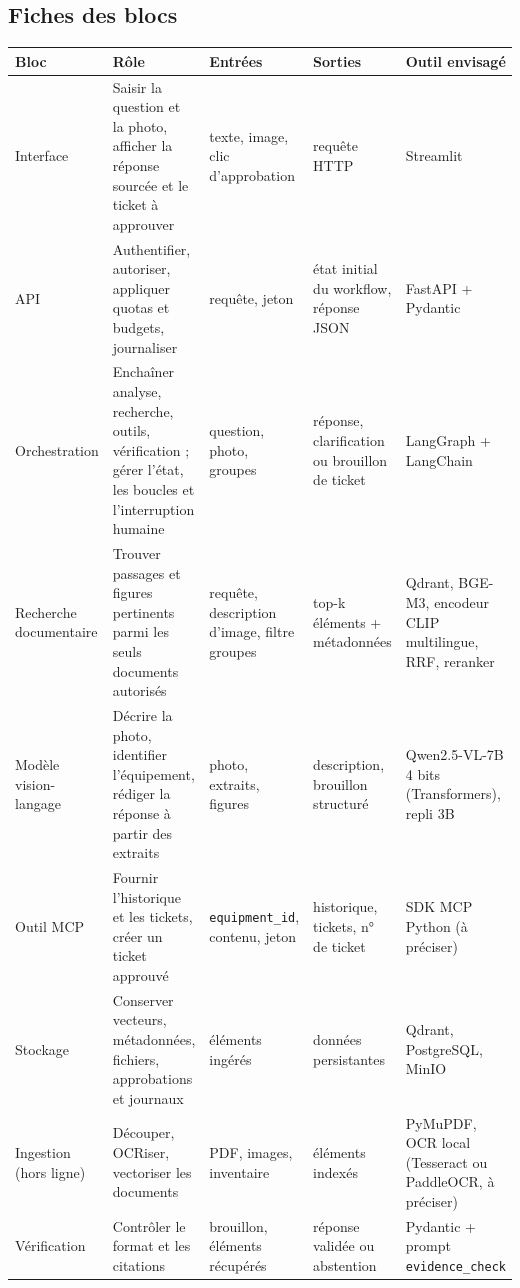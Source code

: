 \documentclass[11pt,a4paper]{article}
\begin{document}
\subsection{Fiches des blocs}
\begin{center}\small
\begin{longtable}{L{2.3cm}L{3.9cm}L{2.9cm}L{3.0cm}L{2.8cm}}
\toprule
\textbf{Bloc} & \textbf{Rôle} & \textbf{Entrées} & \textbf{Sorties} & \textbf{Outil envisagé}\\\midrule\endhead
Interface & Saisir la question et la photo, afficher la réponse sourcée et le ticket à approuver & texte, image, clic d'approbation & requête HTTP & Streamlit\\
API & Authentifier, autoriser, appliquer quotas et budgets, journaliser & requête, jeton & état initial du workflow, réponse JSON & FastAPI + Pydantic\\
Orchestration & Enchaîner analyse, recherche, outils, vérification ; gérer l'état, les boucles et l'interruption humaine & question, photo, groupes & réponse, clarification ou brouillon de ticket & LangGraph + LangChain\\
Recherche documentaire & Trouver passages et figures pertinents parmi les seuls documents autorisés & requête, description d'image, filtre groupes & top-k éléments + métadonnées & Qdrant, BGE-M3, encodeur CLIP multilingue, RRF, reranker\\
Modèle vision-langage & Décrire la photo, identifier l'équipement, rédiger la réponse à partir des extraits & photo, extraits, figures & description, brouillon structuré & Qwen2.5-VL-7B 4 bits (Transformers), repli 3B\\
Outil MCP & Fournir l'historique et les tickets, créer un ticket approuvé & \texttt{equipment\_id}, contenu, jeton & historique, tickets, n° de ticket & SDK MCP Python (à préciser)\\
Stockage & Conserver vecteurs, métadonnées, fichiers, approbations et journaux & éléments ingérés & données persistantes & Qdrant, PostgreSQL, MinIO\\
Ingestion (hors ligne) & Découper, OCRiser, vectoriser les documents & PDF, images, inventaire & éléments indexés & PyMuPDF, OCR local (Tesseract ou PaddleOCR, à préciser)\\
Vérification & Contrôler le format et les citations & brouillon, éléments récupérés & réponse validée ou abstention & Pydantic + prompt \texttt{evidence\_check}\\
\bottomrule
\end{longtable}
\end{center}
\end{document}
